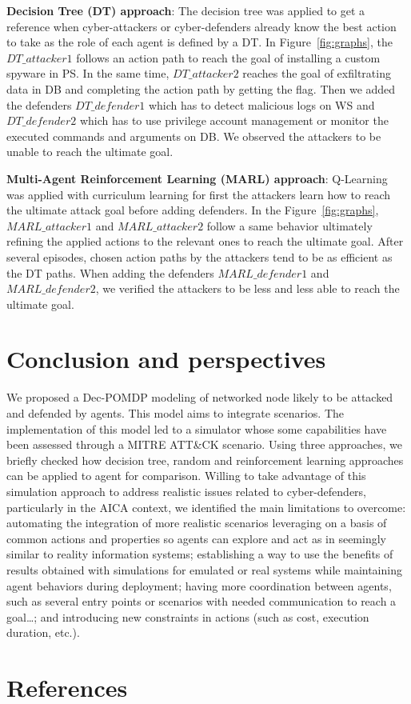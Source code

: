\documentclass[conference]{IEEEtran}
\begin{document}
\noindent
\textbf{Decision Tree (DT) approach}: \quad The decision tree was applied to get a reference when cyber-attackers or cyber-defenders already know the best action to take as the role of each agent is defined by a DT.
In Figure~\ref{fig:graphs}, the $DT\_attacker1$ follows an action path to reach the goal of installing a custom spyware in PS. In the same time, $DT\_attacker2$ reaches the goal of exfiltrating data in DB and completing the action path by getting the flag. Then we added the defenders $DT\_defender1$ which has to detect malicious logs on WS and $DT\_defender2$ which has to use privilege account management or monitor the executed commands and arguments on DB. We observed the attackers to be unable to reach the ultimate goal.

\noindent
\textbf{Multi-Agent Reinforcement Learning (MARL) approach}: \quad Q-Learning~\citep{CWatkins1992} was applied with curriculum learning for first the attackers learn how to reach the ultimate attack goal before adding defenders.
In the Figure~\ref{fig:graphs}, $MARL\_attacker1$ and $MARL\_attacker2$ follow a same behavior ultimately refining the applied actions to the relevant ones to reach the ultimate goal. After several episodes, chosen action paths by the attackers tend to be as efficient as the DT paths. When adding the defenders $MARL\_defender1$ and $MARL\_defender2$, we verified the attackers to be less and less able to reach the ultimate goal.


\section{Conclusion and perspectives}

\noindent
We proposed a Dec-POMDP modeling of networked node likely to be attacked and defended by agents. This model aims to integrate scenarios. The implementation of this model led to a simulator whose some capabilities have been assessed through a MITRE ATT\&CK scenario. Using three approaches, we briefly checked how decision tree, random and reinforcement learning approaches can be applied to agent for comparison.
Willing to take advantage of this simulation approach to address realistic issues related to cyber-defenders, particularly in the AICA context, we identified the main limitations to overcome:
automating the integration of more realistic scenarios leveraging on a basis of common actions and properties so agents can explore and act as in seemingly similar to reality information systems;
establishing a way to use the benefits of results obtained with simulations for emulated or real systems while maintaining agent behaviors during deployment;
having more coordination between agents, such as several entry points or scenarios with needed communication to reach a goal\dots;
and introducing new constraints in actions (such as cost, execution duration, etc.).


\section*{References}


% 


\end{document}

